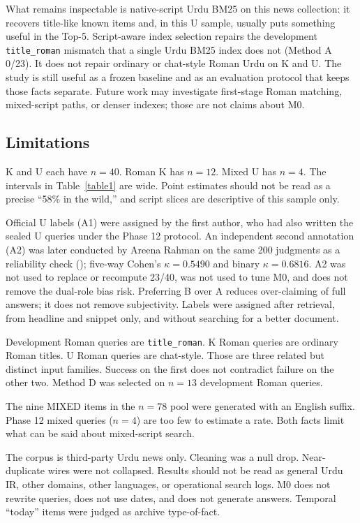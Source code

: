 \documentclass[10pt,letterpaper]{article}
\begin{document}
What remains inspectable is native-script Urdu BM25 on this news collection: it recovers title-like known items and, in this U sample, usually puts something useful in the Top-5. Script-aware index selection repairs the development \texttt{title\_roman} mismatch that a single Urdu BM25 index does not (Method A 0/23). It does not repair ordinary or chat-style Roman Urdu on K and U. The study is still useful as a frozen baseline and as an evaluation protocol that keeps those facts separate. Future work may investigate first-stage Roman matching, mixed-script paths, or denser indexes; those are not claims about M0.

\subsection*{Limitations}

K and U each have $n = 40$. Roman K has $n = 12$. Mixed U has $n = 4$. The intervals in Table~\ref{table1} are wide. Point estimates should not be read as a precise ``58\% in the wild,'' and script slices are descriptive of this sample only.

Official U labels (A1) were assigned by the first author, who had also written the sealed U queries under the Phase 12 protocol. An independent second annotation (A2) was later conducted by Areena Rahman on the same 200 judgments as a reliability check (); five-way Cohen's $\kappa = 0.5490$ and binary $\kappa = 0.6816$. A2 was not used to replace or recompute 23/40, was not used to tune M0, and does not remove the dual-role bias risk. Preferring B over A reduces over-claiming of full answers; it does not remove subjectivity. Labels were assigned after retrieval, from headline and snippet only, and without searching for a better document.

Development Roman queries are \texttt{title\_roman}. K Roman queries are ordinary Roman titles. U Roman queries are chat-style. Those are three related but distinct input families. Success on the first does not contradict failure on the other two. Method D was selected on $n = 13$ development Roman queries.

The nine MIXED items in the $n = 78$ pool were generated with an English suffix. Phase 12 mixed queries ($n = 4$) are too few to estimate a rate. Both facts limit what can be said about mixed-script search.

The corpus is third-party Urdu news only. Cleaning was a null drop. Near-duplicate wires were not collapsed. Results should not be read as general Urdu IR, other domains, other languages, or operational search logs. M0 does not rewrite queries, does not use dates, and does not generate answers. Temporal ``today'' items were judged as archive type-of-fact.
\end{document}
